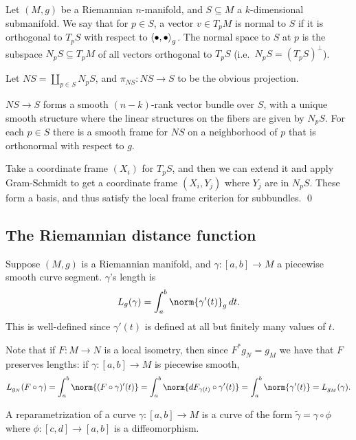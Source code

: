 \bdefn

    Let $(M,g)$ be a Riemannian $n$-manifold, and $S\subseteq M$ a $k$-dimensional submanifold.
    We say that for $p\in S$, a vector $v\in T_pM$ is {\emphcolor normal to $S$} if it is orthogonal to $T_pS$ with respect to $\mathopen{}\mathclose{\left<\bullet,\bullet\right>}_g$.
    The {\emphcolor normal space to $S$} at $p$ is the subspace $N_pS\subseteq T_pM$ of all vectors orthogonal to $T_pS$ (i.e.\ $N_pS=(T_pS)^\perp$).

    Let $NS=\coprod_{p\in S}N_pS$, and $\pi_{NS}\colon NS\to S$ to be the obvious projection.

\edefn

\bprop

    $NS\to S$ forms a smooth $(n-k)$-rank vector bundle over $S$, with a unique smooth structure where the linear structures on the fibers are given by $N_pS$.
    For each $p\in S$ there is a smooth frame for $NS$ on a neighborhood of $p$ that is orthonormal with respect to $g$.

\eprop

\bproof

    Take a coordinate frame $(X_i)$ for $T_pS$, and then we can extend it and apply Gram-Schmidt to get a coordinate frame $(X_i,Y_j)$ where $Y_j$ are in $N_pS$.
    These form a basis, and thus satisfy the local frame criterion for subbundles.
    \qed

\eproof

\subsection{The Riemannian distance function}

\bdefn

    Suppose $(M,g)$ is a Riemannian manifold, and $\gamma\colon[a,b]\to M$ a piecewise smooth curve segment.
    $\gamma$'s {\emphcolor length} is
    $$ L_g(\gamma) = \int_a^b\norm{\gamma'(t)}_g\,dt . $$
    This is well-defined since $\gamma'(t)$ is defined at all but finitely many values of $t$.

\edefn

Note that if $F\colon M\to N$ is a local isometry, then since $F^*g_N=g_M$ we have that $F$ preserves lengths: if $\gamma\colon[a,b]\to M$ is piecewise smooth,
$$ L_{g_N}(F\circ\gamma) = \int_a^b\norm{(F\circ\gamma)'(t)} = \int_a^b\norm{dF_{\gamma(t)}\circ\gamma'(t)} = \int_a^b\norm{\gamma'(t)} = L_{g_M}(\gamma). $$

\bdefn

    A {\emphcolor reparametrization} of a curve $\gamma\colon[a,b]\to M$ is a curve of the form $\tilde\gamma=\gamma\circ\phi$ where $\phi\colon[c,d]\to[a,b]$ is
    a diffeomorphism.


